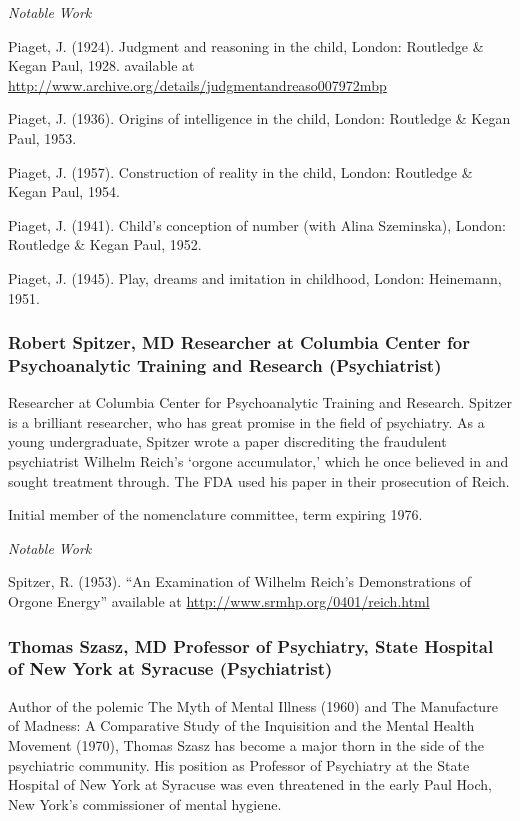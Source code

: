 \begin{refsection}
\emph{Notable Work}

Piaget, J. (1924). Judgment and reasoning in the child, London: Routledge \& Kegan Paul, 1928. available at \url{http://www.archive.org/details/judgmentandreaso007972mbp}

Piaget, J. (1936). Origins of intelligence in the child, London: Routledge \& Kegan Paul, 1953.

Piaget, J. (1957). Construction of reality in the child, London: Routledge \& Kegan Paul, 1954.

Piaget, J. (1941). Child's conception of number (with Alina Szeminska), London: Routledge \& Kegan Paul, 1952.

Piaget, J. (1945). Play, dreams and imitation in childhood, London: Heinemann, 1951.

\subsubsection{Robert Spitzer, MD Researcher at Columbia Center for Psychoanalytic Training and Research (Psychiatrist)}
\label{robertspitzermdresearcheratcolumbiacenterforpsychoanalytictrainingandresearchpsychiatrist}

Researcher at Columbia Center for Psychoanalytic Training and Research. Spitzer is a brilliant researcher, who has great promise in the field of psychiatry. As a young undergraduate, Spitzer wrote a paper discrediting the fraudulent psychiatrist Wilhelm Reich's `orgone accumulator,' which he once believed in and sought treatment through. The FDA used his paper in their prosecution of Reich.

Initial member of the nomenclature committee, term expiring 1976.

\emph{Notable Work}

Spitzer, R. (1953). “An Examination of Wilhelm Reich's Demonstrations of Orgone Energy” available at \url{http://www.srmhp.org/0401/reich.html}

\subsubsection{Thomas Szasz, MD Professor of Psychiatry, State Hospital of New York at Syracuse (Psychiatrist)}
\label{thomasszaszmdprofessorofpsychiatrystatehospitalofnewyorkatsyracusepsychiatrist}

Author of the polemic The Myth of Mental Illness (1960) and The Manufacture of Madness: A Comparative Study of the Inquisition and the Mental Health Movement (1970), Thomas Szasz has become a major thorn in the side of the psychiatric community. His position as Professor of Psychiatry at the State Hospital of New York at Syracuse was even threatened in the early Paul Hoch, New York’s commissioner of mental hygiene.


\end{refsection}
